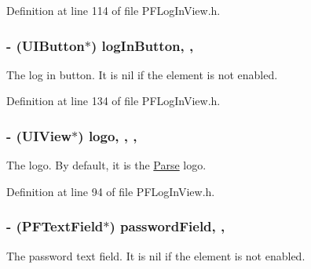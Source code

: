 Definition at line 114 of file P\+F\+Log\+In\+View.\+h.

\hypertarget{interface_p_f_log_in_view_afcadd6b2ccea1a5f06cd82c79dd675f0}{}
\subsubsection[{log\+In\+Button}]{\setlength{\rightskip}{0pt plus 5cm}-\/ (U\+I\+Button$\ast$) log\+In\+Button\hspace{0.3cm}{\ttfamily [read]}, {\ttfamily [nonatomic]}, {\ttfamily [strong]}}\label{interface_p_f_log_in_view_afcadd6b2ccea1a5f06cd82c79dd675f0}
The log in button. It is {\ttfamily nil} if the element is not enabled. 

Definition at line 134 of file P\+F\+Log\+In\+View.\+h.

\hypertarget{interface_p_f_log_in_view_a0d6b5139aea2f3c3a86b3093f7258455}{}
\subsubsection[{logo}]{\setlength{\rightskip}{0pt plus 5cm}-\/ (U\+I\+View$\ast$) logo\hspace{0.3cm}{\ttfamily [read]}, {\ttfamily [write]}, {\ttfamily [nonatomic]}, {\ttfamily [strong]}}\label{interface_p_f_log_in_view_a0d6b5139aea2f3c3a86b3093f7258455}


The logo. By default, it is the \hyperlink{interface_parse}{Parse} logo. 



Definition at line 94 of file P\+F\+Log\+In\+View.\+h.

\hypertarget{interface_p_f_log_in_view_af2a3676f5d1bfaa67de4b48a6bd358b7}{}
\subsubsection[{password\+Field}]{\setlength{\rightskip}{0pt plus 5cm}-\/ ({\bf P\+F\+Text\+Field}$\ast$) password\+Field\hspace{0.3cm}{\ttfamily [read]}, {\ttfamily [nonatomic]}, {\ttfamily [strong]}}\label{interface_p_f_log_in_view_af2a3676f5d1bfaa67de4b48a6bd358b7}
The password text field. It is {\ttfamily nil} if the element is not enabled. 

